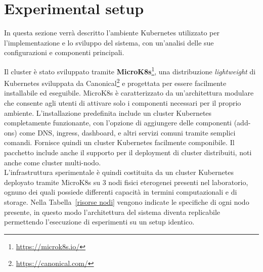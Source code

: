 \section{Experimental setup}
In questa sezione verrà descritto l'ambiente Kubernetes utilizzato per l'implementazione e lo sviluppo del sistema, con un'analisi delle sue configurazioni e componenti principali.

Il cluster è stato sviluppato tramite \textbf{MicroK8s}\footnote{\url{https://microk8s.io/}}, una distribuzione \textit{lightweight} di Kubernetes sviluppata da Canonical\footnote{\url{https://canonical.com/}} e progettata per essere facilmente installabile ed eseguibile.
MicroK8s è caratterizzato da un'architettura modulare che consente agli utenti di attivare solo i componenti necessari per il proprio ambiente.
L'installazione predefinita include un cluster Kubernetes completamente funzionante, con l'opzione di aggiungere delle componenti (add-ons) come DNS, ingress, dashboard, e altri servizi comuni tramite semplici comandi.
Fornisce quindi un cluster Kubernetes facilmente componibile.
Il pacchetto include anche il supporto per il deployment di cluster distribuiti, noti anche come cluster multi-nodo. \\
L'infrastruttura sperimentale è quindi costituita da un cluster Kubernetes deployato tramite MicroK8s su 3 nodi fisici eterogenei presenti nel laboratorio, ognuno dei quali possiede differenti capacità in termini computazionali e di storage.
Nella Tabella~\ref{risorse nodi} vengono indicate le specifiche di ogni nodo presente, in questo modo l'architettura del sistema diventa replicabile permettendo l'esecuzione di esperimenti su un setup identico.


